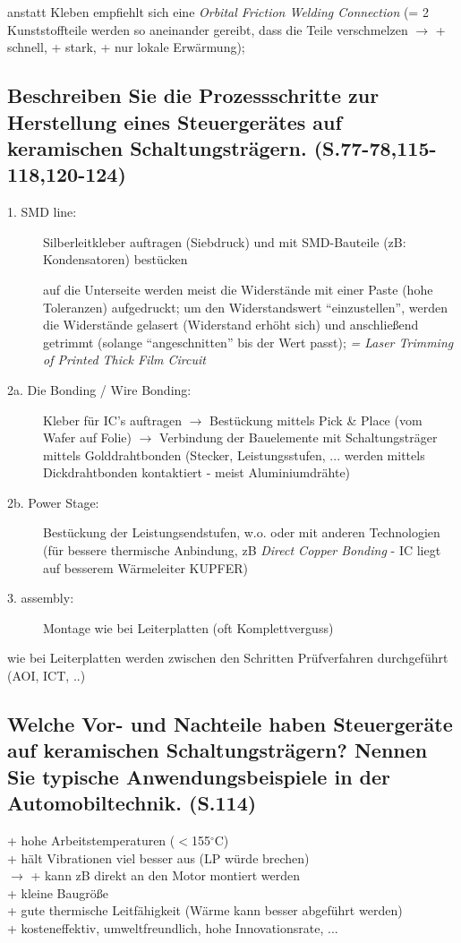anstatt Kleben empfiehlt sich eine \emph{Orbital Friction Welding Connection} (= 2 Kunststoffteile
werden so aneinander gereibt, dass die Teile verschmelzen $\rightarrow$ + schnell, + stark, + nur
lokale Erwärmung);

\subsection{Beschreiben Sie die Prozessschritte zur Herstellung eines Steuergerätes auf keramischen Schaltungsträgern. (S.77-78,115-118,120-124)}
\begin{description}
\item[1. SMD line:] Silberleitkleber auftragen (Siebdruck) und mit SMD-Bauteile (zB: Kondensatoren) 
  bestücken

  auf die Unterseite werden meist die Widerstände mit einer Paste (hohe Toleranzen) aufgedruckt; um
  den Widerstandswert ``einzustellen'', werden die Widerstände gelasert (Widerstand erhöht sich) und 
  anschließend getrimmt (solange ``angeschnitten'' bis der Wert passt); \emph{= Laser Trimming of
    Printed Thick Film Circuit}
\item[2a. Die Bonding / Wire Bonding:] Kleber für IC's auftragen $\rightarrow$ Bestückung mittels
  Pick \& Place (vom Wafer auf Folie) $\rightarrow$ Verbindung der Bauelemente mit Schaltungsträger
  mittels Golddrahtbonden (Stecker, Leistungsstufen, ... werden mittels Dickdrahtbonden kontaktiert
  - meist Aluminiumdrähte)
\item[2b. Power Stage:] Bestückung der Leistungsendstufen, w.o. oder mit anderen Technologien 
  (für bessere thermische Anbindung, zB \emph{Direct Copper Bonding} - IC liegt auf besserem 
  Wärmeleiter KUPFER)
\item[3. assembly:] Montage wie bei Leiterplatten (oft Komplettverguss)
\end{description}
wie bei Leiterplatten werden zwischen den Schritten Prüfverfahren durchgeführt (AOI, ICT, ..)

\subsection{Welche Vor- und Nachteile haben Steuergeräte auf keramischen Schaltungsträgern? Nennen Sie typische Anwendungsbeispiele in der Automobiltechnik. (S.114)}
+ hohe Arbeitstemperaturen ($<$155$^{\circ}$C) \\
+ hält Vibrationen viel besser aus (LP würde brechen) \\
$\rightarrow$ + kann zB direkt an den Motor montiert werden \\
+ kleine Baugröße \\
+ gute thermische Leitfähigkeit (Wärme kann besser abgeführt werden) \\
+ kosteneffektiv, umweltfreundlich, hohe Innovationsrate, ...

